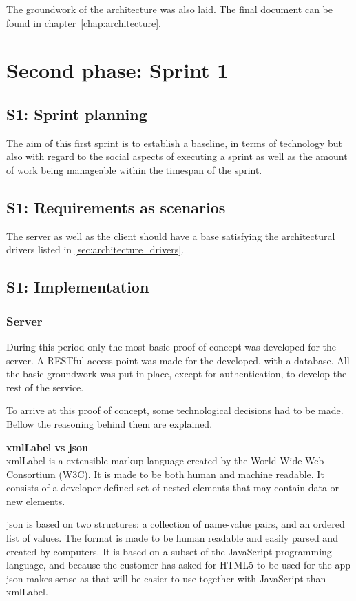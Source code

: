 \documentclass[11pt]{book}
\begin{document}
The groundwork of the architecture was also laid. The final document can be found in chapter~\ref{chap:architecture}.

\section{Second phase: Sprint 1}
\subsection{S1: Sprint planning}
The aim of this first sprint is to establish a baseline, in terms of technology but also with regard to the social aspects of executing a sprint as well as the amount of work being manageable within the timespan of the sprint.

\subsection{S1: Requirements as scenarios}
The server as well as the client should have a base satisfying the architectural drivers listed in \ref{sec:architecture_drivers}.

\subsection{S1: Implementation}

\subsubsection{Server}
During this period only the most basic proof of concept was developed for the server. A RESTful access point was made for the developed, with a database. All the basic groundwork was put in place, except for authentication, to develop the rest of the service.

To arrive at this proof of concept, some technological decisions had to be made. Bellow the reasoning behind them are explained.

\textbf{\gls{xmlLabel} vs \gls{json}}\\
\gls{xmlLabel} is a extensible markup language created by the World Wide Web Consortium (W3C). It is made to be both human and machine readable. It consists of a developer defined set of nested elements that may contain data or new elements.

\gls{json} \cite{json} is based on two structures: a collection of name-value pairs, and an ordered list of values. The format is made to be human readable and easily parsed and created by computers. It is based on a subset of the JavaScript programming language, and because the customer has asked for HTML5 to be used for the app \gls{json} makes sense as that will be easier to use together with JavaScript than \gls{xmlLabel}.
\end{document}
